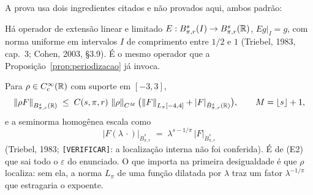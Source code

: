\documentclass[11pt,a4paper]{article}
\begin{document}
A prova usa dois ingredientes citados e não provados aqui, ambos padrão:

\begin{description}[nosep]
  \item[(E1) Extensão.] Há operador de extensão linear e limitado
    $E : B^{s}_{\pi,r}(I) \to B^{s}_{\pi,r}(\mathbb{R})$, $Eg|_{I} = g$, com
    norma uniforme em intervalos $I$ de comprimento entre $1/2$ e $1$
    (Triebel, 1983, cap.~3; Cohen, 2003, \S 3.9). É o mesmo operador que a
    Proposição~\ref{prop:periodizacao} já invoca.
  \item[(E2) Produto localizado e dilatação.] Para $\rho \in
    C^{\infty}_{c}(\mathbb{R})$ com suporte em $[-3,3]$,
    \[
      \left\lVert \rho F \right\rVert_{B^{s}_{\pi,r}(\mathbb{R})} \;\le\;
      C(s,\pi,r)\,\left\lVert \rho \right\rVert_{C^{M}}\bigl(
      \left\lVert F \right\rVert_{L_{\pi}[-4,4]} + |F|_{\dot B^{s}_{\pi,r}(\mathbb{R})}\bigr),
      \qquad M = \lfloor s\rfloor + 1,
    \]
    e a seminorma homogênea escala como
    \[
      |F(\lambda\,\cdot)|_{\dot B^{s}_{\pi,r}} \;=\;
      \lambda^{s - 1/\pi}\,|F|_{\dot B^{s}_{\pi,r}}
    \]
    (Triebel, 1983; \texttt{[VERIFICAR]}: a localização interna não foi
    conferida). É de (E2)
    que sai todo o $\varepsilon$ do enunciado. O que importa na primeira
    desigualdade é que $\rho$ localiza: sem ela, a norma $L_{\pi}$ de uma
    função dilatada por $\lambda$ traz um fator $\lambda^{-1/\pi}$ que
    estragaria o expoente.
\end{description}
\end{document}
